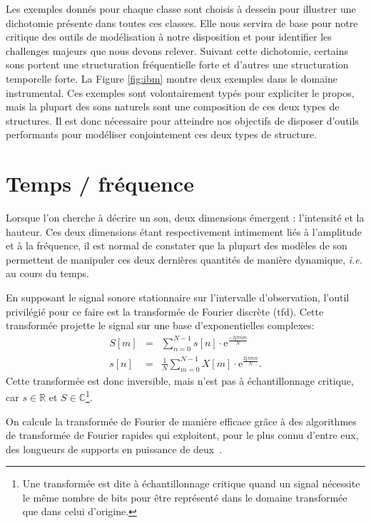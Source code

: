 Les exemples donnés pour chaque classe sont choisis à dessein pour illustrer une dichotomie présente dans toutes ces classes. Elle nous servira de base pour notre critique des outils de modélisation à notre disposition et pour identifier les challenges majeurs que nous devons relever. Suivant cette dichotomie, certains sons portent une structuration fréquentielle forte et d'autres une structuration temporelle forte. La Figure \ref{fig:ibm} montre deux exemples dans le domaine instrumental. Ces exemples sont volontairement typés pour expliciter le propos, mais la plupart des sons naturels sont une composition de ces deux types de structures. Il est donc nécessaire pour atteindre nos objectifs de disposer d'outils performants pour modéliser conjointement ces deux types de structure.

\section{ \nmu Temps / fréquence} \label{sec:tf}

Lorsque l'on cherche à décrire un son, deux dimensions émergent : l'intensité et la hauteur. Ces deux dimensions étant respectivement intimement liés à l'amplitude et à la fréquence, il est normal de constater que la plupart des modèles de son permettent de manipuler ces deux dernières quantités de manière dynamique, \textit{i.e.} au cours du temps.

En supposant le signal sonore stationnaire sur l'intervalle d'observation, l'outil privilégié pour ce faire est la transformée de Fourier discrète (tfd). Cette transformée projette le signal sur une base d'exponentielles complexes:
\begin{eqnarray}
  S[m] &=& \sum_{n=0}^{N-1} s[n] \cdot \mathrm{e}^{\frac{-2 \mathrm{j} \pi nm}{N}} \\
  s[n] &=& \frac{1}{N} \sum_{m=0}^{N-1} X[m] \cdot \mathrm{e}^{\frac{ 2 \mathrm{j} \pi m n }{N}}.
\end{eqnarray}
Cette transformée est donc inversible, mais n'est pas à échantillonnage critique, car $s\in \mathbb{R}$  et $S \in \mathbb{C}$\footnote{Une transformée est dite à échantillonnage critique quand un signal nécessite le même nombre de bits pour être représenté dans le domaine transformée que dans celui d'origine.}.

On calcule la transformée de Fourier de manière efficace grâce à des algorithmes de transformée de Fourier rapides qui exploitent, pour le plus connu d'entre eux, des longueurs de supports en puissance de deux~\cite{cooley1965algorithm}.

